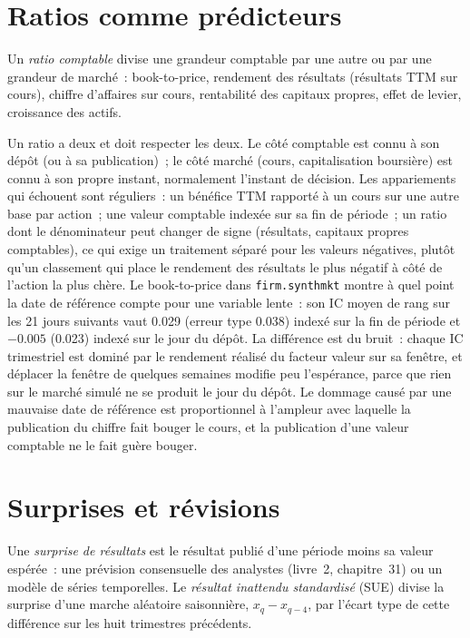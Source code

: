 \section{Ratios comme prédicteurs}

\begin{definition}\label{def:rs:fundamental-analyst-and-event-features:ratio}
Un \emph{ratio comptable} divise une grandeur comptable par une autre ou par une grandeur de marché~: book-to-price,
rendement des résultats (résultats TTM sur cours), chiffre d'affaires sur cours, rentabilité des capitaux propres, effet de levier, croissance des actifs.
\end{definition}

Un ratio a deux  et doit respecter les deux. Le côté comptable est connu à son dépôt (ou à sa publication)~; le côté marché
(cours, capitalisation boursière) est connu à son propre instant, normalement l'instant de décision. Les appariements qui échouent sont réguliers~: un bénéfice TTM
rapporté à un cours sur une autre base par action~; une valeur comptable indexée sur sa fin de période~; un ratio dont le dénominateur peut changer de signe
(résultats, capitaux propres comptables), ce qui exige un traitement séparé pour les valeurs négatives, plutôt qu'un classement qui place le rendement des résultats le plus
négatif à côté de l'action la plus chère. Le book-to-price dans \texttt{firm.synthmkt} montre à quel point la date de référence compte pour une variable lente~:
son IC moyen de rang sur les 21 jours suivants vaut 0.029 (erreur type 0.038) indexé sur la fin de période et $-0.005$ (0.023) indexé sur le jour du
dépôt. La différence est du bruit~: chaque IC trimestriel est dominé par le rendement réalisé du facteur valeur sur sa fenêtre, et déplacer la fenêtre
de quelques semaines modifie peu l'espérance, parce que rien sur le marché simulé ne se produit le jour du dépôt. Le dommage causé par une mauvaise
date de référence est proportionnel à l'ampleur avec laquelle la publication du chiffre fait bouger le cours, et la publication d'une valeur comptable ne le fait guère bouger.

\section{Surprises et révisions}

\begin{definition}\label{def:rs:fundamental-analyst-and-event-features:sue}
Une \emph{surprise de résultats} est le résultat publié d'une période moins sa valeur espérée~: une prévision consensuelle
des analystes (livre~2, chapitre~31) ou un modèle de séries temporelles. Le \emph{résultat inattendu standardisé} (SUE)
divise la surprise d'une marche aléatoire saisonnière, $x_q - x_{q-4}$, par l'écart type de cette différence sur les huit
trimestres précédents.
\end{definition}

